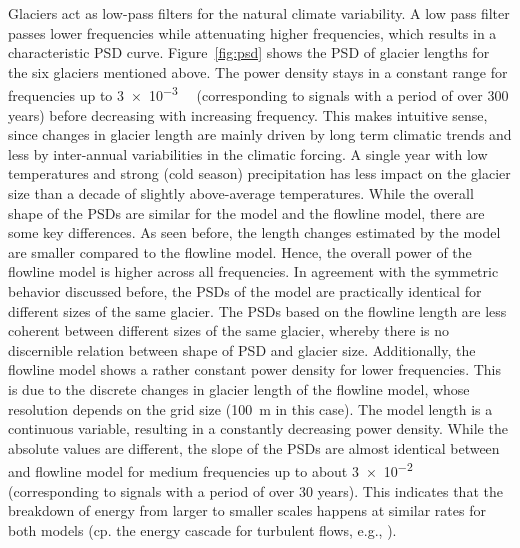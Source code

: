       Glaciers act as low-pass filters for the natural climate variability. A low pass filter passes lower frequencies while attenuating higher frequencies, which results in a characteristic PSD curve. Figure~\ref{fig:psd} shows the PSD of glacier lengths for the six glaciers mentioned above. The power density stays in a constant range for frequencies up to \SI{3e-3}{\per\year} (corresponding to signals with a period of over 300 years) before decreasing with increasing frequency. This makes intuitive sense, since changes in glacier length are mainly driven by long term climatic trends and less by inter-annual variabilities in the climatic forcing. A single year with low temperatures and strong (cold season) precipitation has less impact on the glacier size than a decade of slightly above-average temperatures.
      While the overall shape of the PSDs are similar for the \vas{} model and the flowline model, there are some key differences. As seen before, the length changes estimated by the \vas{} model are smaller compared to the flowline model. Hence, the overall power of the flowline model is higher across all frequencies. In agreement with the symmetric behavior discussed before, the PSDs of the \vas{} model are practically identical for different sizes of the same glacier. The PSDs based on the flowline length are less coherent between different sizes of the same glacier, whereby there is no discernible relation between shape of PSD and glacier size.
      Additionally, the flowline model shows a rather constant power density for lower frequencies. This is due to the discrete changes in glacier length of the flowline model, whose resolution depends on the grid size (\SI{100}{\meter} in this case). The \vas{} model length is a continuous variable, resulting in a constantly decreasing power density.
      While the absolute values are different, the slope of the PSDs are almost identical between \vas{} and flowline model for medium frequencies up to about \SI{3e-2}{\per\year} (corresponding to signals with a period of over 30 years). This indicates that the breakdown of energy from larger to smaller scales happens at similar rates for both models (cp. the energy cascade for turbulent flows, e.g., \cite{Wyngaard2010}).

